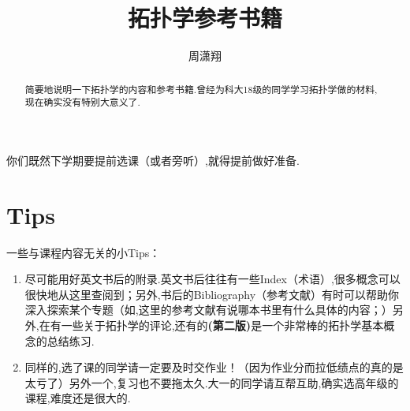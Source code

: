 \documentclass[11pt,A4paper,oneside]{amsart}
\numberwithin{equation}{section}
\theoremstyle{plain}
\theoremstyle{plain}
\numberwithin{equation}{section}
\theoremstyle{remark}
\begin{document}
\title[]{\LARGE 拓扑学参考书籍}


\author[]{\large 周潇翔}
\address{School of Mathematical Sciences\\
University of Science and Technology of China\\
Hefei, 230026\\ P.R. China\\}
\maketitle




\begin{abstract}
简要地说明一下拓扑学的内容和参考书籍.曾经为科大18级的同学学习拓扑学做的材料,现在确实没有特别大意义了.
\end{abstract}





你们既然下学期要提前选课（或者旁听）,就得提前做好准备.
\section{Tips}
一些与课程内容无关的小Tips：
\begin{enumerate}
	\item 尽可能用好英文书后的附录.英文书后往往有一些Index（术语）,很多概念可以很快地从这里查阅到；另外,书后的Bibliography（参考文献）有时可以帮助你深入探索某个专题（如,\cite{MAA97}这里的参考文献有说哪本书里有什么具体的内容；）另外,在\cite[p577]{EC18}有一些关于拓扑学的评论,还有\cite[Appendix A]{JM08}的\textbf{(第二版)}是一个非常棒的拓扑学基本概念的总结练习.
	\item 同样的,选了课的同学请一定要及时交作业！（因为作业分而拉低绩点的真的是太亏了）另外一个,复习也不要拖太久.大一的同学请互帮互助,确实选高年级的课程,难度还是很大的.
\end{enumerate}
\end{document}
